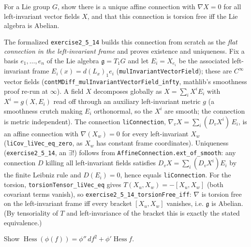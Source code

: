 \begin{remark}
  \label{rem:pet-ch2-ex-14}
  \leanok
  For a Lie group $G$, show there is a unique affine connection with
  $\nabla X=0$ for all left-invariant vector fields $X$, and that this
  connection is torsion free iff the Lie algebra is Abelian.

  The formalized \texttt{exercise2\_5\_14} builds this connection from scratch as
  the \emph{flat connection in the left-invariant frame} and proves existence and
  uniqueness. Fix a basis $e_1,\dots,e_n$ of the Lie algebra
  $\mathfrak g=T_1G$ and let $E_i=X_{e_i}$ be the associated left-invariant frame
  $E_i(x)=d(L_x)_1 e_i$ (\texttt{mulInvariantVectorField}); these are $C^\infty$
  vector fields (\texttt{contMDiff\_mulInvariantVectorField\_infty}, mathlib's
  smoothness proof re-run at $\infty$). A field $X$ decomposes globally as
  $X=\sum_i X^i E_i$ with $X^i=g(X,E_i)$ read off through an auxiliary
  left-invariant metric $g$ (a smoothness crutch making $E_i$ orthonormal, so the
  $X^i$ are smooth; the connection is metric independent). The connection
  \texttt{liConnection}, $\nabla_v X=\sum_i (D_v X^i)\,E_i$, is an affine
  connection with $\nabla(X_w)=0$ for every left-invariant $X_w$
  (\texttt{liCov\_liVec\_eq\_zero}, as $X_w$ has constant frame coordinates).
  Uniqueness (\texttt{exercise2\_5\_14}, an $\exists!$) follows from
  \texttt{AffineConnection.ext\_of\_smooth}: any connection $D$ killing all
  left-invariant fields satisfies $D_vX=\sum_i(D_vX^i)E_i$ by the finite Leibniz
  rule and $D(E_i)=0$, hence equals \texttt{liConnection}. For the torsion,
  \texttt{torsionTensor\_liVec\_eq} gives $T(X_u,X_w)=-[X_u,X_w]$ (both covariant
  terms vanish), so \texttt{exercise2\_5\_14\_torsionFree\_iff}: $\nabla$ is
  torsion free on the left-invariant frame iff every bracket $[X_u,X_w]$ vanishes,
  i.e. $\mathfrak g$ is Abelian. (By tensoriality of $T$ and left-invariance of
  the bracket this is exactly the stated equivalence.)
\end{remark}

\begin{remark}
  \label{rem:pet-ch2-ex-15}
  \leanok
  Show $\operatorname{Hess}(\phi(f))=\phi''\,df^2+\phi'\operatorname{Hess}f$.
\end{remark}

